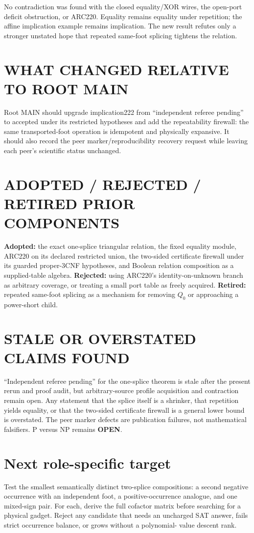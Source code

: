 \documentclass[11pt]{article}
\newcommand{\OPEN}{\textbf{OPEN}}
\begin{document}
No contradiction was found with the closed equality/XOR wires, the open-port
deficit obstruction, or ARC220. Equality remains equality under repetition;
the affine implication example remains implication. The new result refutes
only a stronger unstated hope that repeated same-foot splicing tightens the
relation.

\section{WHAT CHANGED RELATIVE TO ROOT MAIN}
Root MAIN should upgrade implication222 from ``independent referee pending''
to accepted under its restricted hypotheses and add the repeatability
firewall: the same transported-foot operation is idempotent and physically
expansive. It should also record the peer marker/reproducibility recovery
request while leaving each peer's scientific status unchanged.

\section{ADOPTED / REJECTED / RETIRED PRIOR COMPONENTS}
\textbf{Adopted:} the exact one-splice triangular relation, the fixed equality
module, ARC220 on its declared restricted union, the two-sided certificate
firewall under its guarded proper-3CNF hypotheses, and Boolean relation
composition as a supplied-table algebra. \textbf{Rejected:} using ARC220's
identity-on-unknown branch as arbitrary coverage, or treating a small port
table as freely acquired. \textbf{Retired:} repeated same-foot splicing as a
mechanism for removing $Q_0$ or approaching a power-short child.

\section{STALE OR OVERSTATED CLAIMS FOUND}
``Independent referee pending'' for the one-splice theorem is stale after the
present rerun and proof audit, but arbitrary-source profile acquisition and
contraction remain open. Any statement that the splice itself is a shrinker,
that repetition yields equality, or that the two-sided certificate firewall
is a general lower bound is overstated. The peer marker defects are publication
failures, not mathematical falsifiers. P versus NP remains \OPEN.

\section*{Next role-specific target}
Test the smallest semantically distinct two-splice compositions: a second
negative occurrence with an independent foot, a positive-occurrence analogue,
and one mixed-sign pair. For each, derive the full cofactor matrix before
searching for a physical gadget. Reject any candidate that needs an uncharged
SAT answer, fails strict occurrence balance, or grows without a polynomial-
value descent rank.
\end{document}
